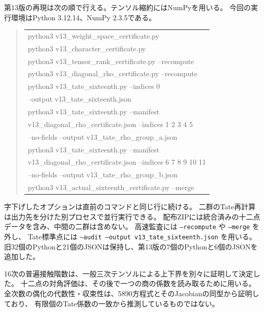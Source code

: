 第13版の再現は次の順で行える。テンソル縮約にはNumPyを用いる。
今回の実行環境はPython 3.12.14、NumPy 2.3.5である。
\begin{quote}\footnotesize\ttfamily
\begin{tabular}{@{}l@{}}
python3 v13\_weight\_space\_certificate.py\\
python3 v13\_character\_certificate.py\\
python3 v13\_tensor\_rank\_certificate.py --recompute\\
python3 v13\_diagonal\_rho\_certificate.py --recompute\\
python3 v13\_tate\_sixteenth.py --indices 0\\
\quad --output v13\_tate\_sixteenth.json\\
python3 v13\_tate\_sixteenth.py --manifest\\
\quad v13\_diagonal\_rho\_certificate.json --indices 1 2 3 4 5\\
\quad --no-fields --output v13\_tate\_rho\_group\_a.json\\
python3 v13\_tate\_sixteenth.py --manifest\\
\quad v13\_diagonal\_rho\_certificate.json --indices 6 7 8 9 10 11\\
\quad --no-fields --output v13\_tate\_rho\_group\_b.json\\
python3 v13\_actual\_sixteenth\_certificate.py --merge\\
\end{tabular}
\end{quote}
字下げしたオプションは直前のコマンドと同じ行に続ける。
二群のTate再計算は出力先を分けた別プロセスで並行実行できる。
配布ZIPには統合済みの十二点データを含み、中間の二群は含めない。
高速監査には \texttt{--recompute} や \texttt{--merge} を外し、
Tate標準点には \texttt{--audit --output v13\_tate\_sixteenth.json} を用いる。
旧32個のPythonと21個のJSONは保持し、第13版の7個のPythonと6個のJSONを追加した。

16次の普遍接触階数は、一般三次テンソルによる上下界を別々に証明して決定した。
十二点の対角評価は、その後で一つの商の係数を読み取るために用いる。
全次数の偶化の代数性・収束性は、5890方程式とそのJacobianの同型から証明しており、
有限個のTate係数の一致から推測しているものではない。

